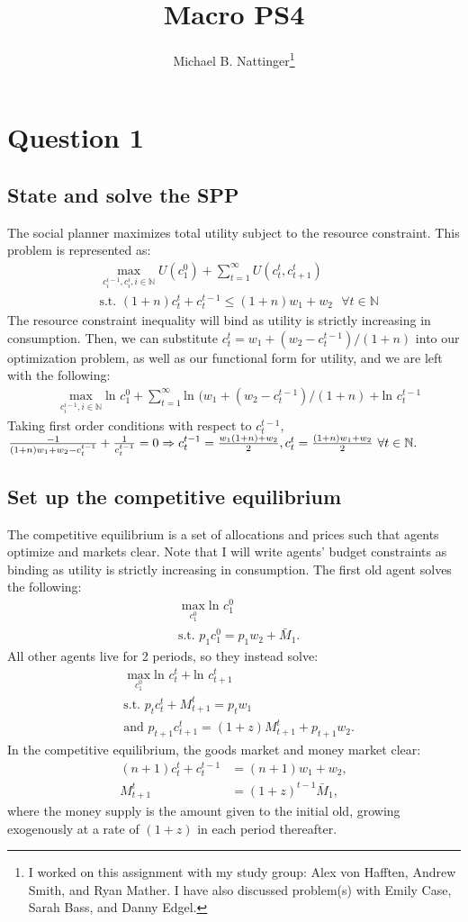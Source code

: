 \documentclass[11pt]{article} %
\title{Macro PS4}
\author{Michael B. Nattinger\footnote{I worked on this assignment with my study group: Alex von Hafften, Andrew Smith, and Ryan Mather. I have also discussed problem(s) with Emily Case, Sarah Bass, and Danny Edgel.}}
\begin{document}
\maketitle

\section{Question 1}
\subsection{State and solve the SPP}
The social planner maximizes total utility subject to the resource constraint. This problem is represented as:
\begin{align*}
&\max_{c_{i}^{i-1},c_i^i, i \in \mathbb{N}} U(c_1^0) + \sum_{t=1}^{\infty} U(c_t^t,c_{t+1}^t)\\
&\text{s.t. } (1+n)c_t^t +c_t^{t-1} \leq (1+n)w_1 + w_2 \text{ } \forall t \in \mathbb{N}
\end{align*}
The resource constraint inequality will bind as utility is strictly increasing in consumption. Then, we can substitute $c_t^t = w_1+(w_2-c_t^{t-1})/(1+n)$ into our optimization problem, as well as our functional form for utility, and we are left with the following:
\begin{align*}
&\max_{c_{i}^{i-1}, i \in \mathbb{N}} \text{ln }c_1^0 + \sum_{t=1}^{\infty} \text{ln }(w_1+(w_2-c_t^{t-1})/(1+n) + \text{ln }c_{t}^{t-1}
\end{align*}
Taking first order conditions with respect to $c_t^{t-1}$, $\frac{-1}{(1+n)w_1+w_2-c_t^{t-1}} + \frac{1}{c_t^{t-1}} = 0 \\ \Rightarrow c_t^{t-1} = \frac{w_1(1+n)+w_2}{2}, c_t^t = \frac{(1+n)w_1+w_2}{2} \text{ } \forall t \in \mathbb{N}.$ 
\subsection{Set up the competitive equilibrium}
The competitive equilibrium is a set of allocations and prices such that agents optimize and markets clear. Note that I will write agents' budget constraints as binding as utility is strictly increasing in consumption. The first old agent solves the following:
\begin{align*}
&\max_{c_1^0} \text{ln } c_1^0 \\
&\text{s.t. } p_1c_1^0 = p_1w_2 + \bar{M}_1.
\end{align*}
All other agents live for 2 periods, so they instead solve:
\begin{align*}
&\max_{c_1^0} \text{ln } c_t^t + \text{ln } c_{t+1}^t \\
&\text{s.t. } p_tc_t^t + M^t_{t+1}= p_tw_1 \\
&\text{and } p_{t+1}c_{t+1}^t = (1+z)M_{t+1}^t  + p_{t+1}w_2.
\end{align*}
In the competitive equilibrium, the goods market and money market clear:
\begin{align*}
(n+1)c_t^t +c_t^{t-1} &= (n+1)w_1 + w_2, \\
M_{t+1}^t  &= (1+z)^{t-1}\bar{M}_1,
\end{align*}
where the money supply is the amount given to the initial old, growing exogenously at a rate of $(1+z)$ in each period thereafter.
\end{document}
